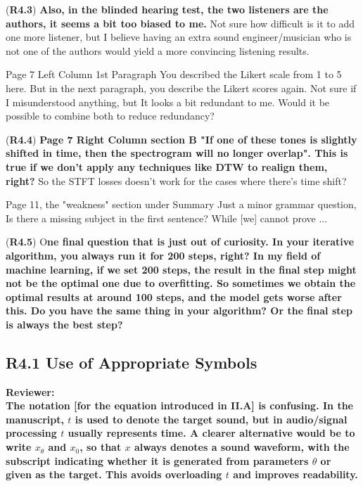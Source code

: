 \documentclass[11pt]{article}
\begin{document}
(\textbf{R4.3}) \textbf{Also, in the blinded hearing test, the two listeners are the authors, it seems a bit too biased to me.} Not sure how difficult is it to add one more listener, but I believe having an extra sound engineer/musician who is not one of the authors would yield a more convincing listening results.

Page 7 Left Column 1st Paragraph
You described the Likert scale from 1 to 5 here. But in the next paragraph, you describe the Likert scores again. Not sure if I misunderstood anything, but It looks a bit redundant to me. Would it be possible to combine both to reduce redundancy?

(\textbf{R4.4}) \textbf{Page 7 Right Column section B
"If one of these tones is slightly shifted in time, then the spectrogram will no longer overlap". This is true if we don't apply any techniques like DTW to realign them, right?}
So the STFT losses doesn't work for the cases where there's time shift?

Page 11, the "weakness" section under Summary
Just a minor grammar question, Is there a missing subject in the first sentence?
While [we] cannot prove ...


(\textbf{R4.5}) O\textbf{ne final question that is just out of curiosity.
In your iterative algorithm, you always run it for 200 steps, right?
In my field of machine learning, if we set 200 steps, the result in the final step might not be the optimal one due to overfitting. So sometimes we obtain the optimal results at around 100 steps, and the model gets worse after this.
Do you have the same thing in your algorithm? Or the final step is always the best step?}



\subsection{\textbf{R4.1} Use of Appropriate Symbols}
\noindent\textbf{Reviewer:}\\
\textbf{The notation \textbf{[for the equation introduced in II.A]} is confusing. In the manuscript, $t$ is used to denote the target sound, but in audio/signal processing $t$ usually represents time.  
A clearer alternative would be to write $x_\theta$ and $x_0$, so that $x$ always denotes a sound waveform, with the subscript indicating whether it is generated from parameters $\theta$ or given as the target.  
This avoids overloading $t$ and improves readability.}
\\
\end{document}
